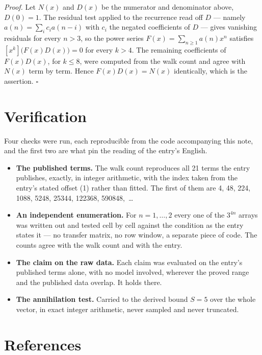 \documentclass[11pt]{article}
\theoremstyle{definition}
\begin{document}
{\itshape Proof.} Let $N(x)$ and $D(x)$ be the numerator and denominator above, $D(0)=1$. The residual test applied to the recurrence read off $D$ --- namely $a(n) = \sum_i c_i a(n-i)$ with $c_i$ the negated coefficients of $D$ --- gives vanishing residuals for every $n > 3$, so the power series $F(x)=\sum_{n\ge 1}a(n)x^n$ satisfies $[x^k]\bigl(F(x)D(x)\bigr) = 0$ for every $k > 4$. The remaining coefficients of $F(x)D(x)$, for $k \le 8$, were computed from the walk count and agree with $N(x)$ term by term. Hence $F(x)D(x) = N(x)$ identically, which is the assertion. $\square$

\section{Verification}

Four checks were run, each reproducible from the code accompanying this note, and the first two are what pin the reading of the entry's English.

\begin{itemize}

\item {\bfseries The published terms.} The walk count reproduces all 21 terms the entry publishes, exactly, in integer arithmetic, with the index taken from the entry's stated offset (1) rather than fitted. The first of them are 4, 48, 224, 1088, 5248, 25344, 122368, 590848,~\dots

\item {\bfseries An independent enumeration.} For $n = 1,\dots,2$ every one of the $3^{4n}$ arrays was written out and tested cell by cell against the condition as the entry states it --- no transfer matrix, no row window, a separate piece of code. The counts agree with the walk count and with the entry.

\item {\bfseries The claim on the raw data.} Each claim was evaluated on the entry's published terms alone, with no model involved, wherever the proved range and the published data overlap. It holds there.

\item {\bfseries The annihilation test.} Carried to the derived bound $S = 5$ over the whole vector, in exact integer arithmetic, never sampled and never truncated.

\end{itemize}

\section{References}
\end{document}
